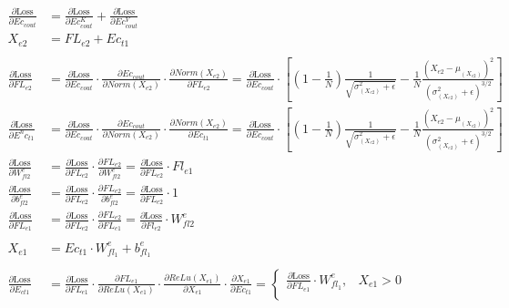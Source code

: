 \documentclass[12pt,letterpaper]{article}
\begin{document}
\begin{align*}
\\
\frac{\partial \text{Loss}}{\partial Ec_{cout}} &= %
\frac{\partial \text{Loss}}{\partial Ec^K_{cout}}+
\frac{\partial \text{Loss}}{\partial Ec^V_{cout}}
\\
X_{e2}&=FL_{e2}+Ec_{t1}
\\\\
\frac{\partial \text{Loss}}{\partial FL_{e2}} &= %
\frac{\partial \text{Loss}}{\partial Ec_{cout}}\cdot
\frac{\partial Ec_{cout}}{\partial Norm(X_{e2})}\cdot
\frac{\partial Norm(X_{e2})}{\partial FL_{e2}}=
\frac{\partial \text{Loss}}{\partial Ec_{cout}}\cdot
\left[(1-\frac{1}{N}) \frac{1}{\sqrt{\sigma^2_{(X_{e2})}+\epsilon}}-\frac{1}{N}\frac{(X_{e2}-\mu_{(X_{e2})})^2}{(\sigma^2_{(X_{e2})}+\epsilon)^{3/2}}\right] 
\\
\frac{\partial \text{Loss}}{\partial E^{n}c_{t1}} &= %
\frac{\partial \text{Loss}}{\partial Ec_{cout}}\cdot
\frac{\partial Ec_{cout}}{\partial Norm(X_{e2})}\cdot
\frac{\partial Norm(X_{e2})}{\partial Ec_{t1}}=
\frac{\partial \text{Loss}}{\partial Ec_{cout}}\cdot
\left[(1-\frac{1}{N}) \frac{1}{\sqrt{\sigma^2_{(X_{e2})}+\epsilon}}-\frac{1}{N}\frac{(X_{e2}-\mu_{(X_{e2})})^2}{(\sigma^2_{(X_{e2})}+\epsilon)^{3/2}}\right] 
\\
\frac{\partial \text{Loss}}{\partial W^e_{fl2}} &= %
\frac{\partial \text{Loss}}{\partial FL_{e2}}\cdot
\frac{\partial FL_{e2}}{\partial W^e_{fl2}}=
\frac{\partial \text{Loss}}{\partial FL_{e2}}\cdot Fl_{e1}
\\
\frac{\partial \text{Loss}}{\partial b^e_{fl2}} &= %
\frac{\partial \text{Loss}}{\partial FL_{e2}}\cdot
\frac{\partial FL_{e2}}{\partial b^e_{fl2}}=
\frac{\partial \text{Loss}}{\partial FL_{e2}}\cdot 1
\\ 
\frac{\partial \text{Loss}}{\partial FL_{e1}} &= %
\frac{\partial \text{Loss}}{\partial FL_{e2}}\cdot
\frac{\partial FL_{e2}}{\partial FL_{e1}}=
\frac{\partial \text{Loss}}{\partial Fl_{e2}}\cdot W^e_{fl2}
\\
\\
X_{e1}&=Ec_{t1}\cdot W^e_{fl_1}+b^e_{fl_1}
\\
\\
\frac{\partial \text{Loss}}{\partial E_{ct1}} &= %
\frac{\partial \text{Loss}}{\partial FL_{e1}} \cdot
\frac{\partial FL_{e1}}{\partial ReLu(X_{e1})} \cdot
\frac{\partial ReLu(X_{e1})}{\partial X_{e1}} \cdot
\frac{\partial X_{e1}}{\partial Ec_{t1}}=
 \begin{cases}
    \frac{\partial \text{Loss}}{\partial FL_{e1}} \cdot W^e_{fl_1}, &  X_{e1} > 0 \\

\end{cases}
\end{align*}
\end{document}
